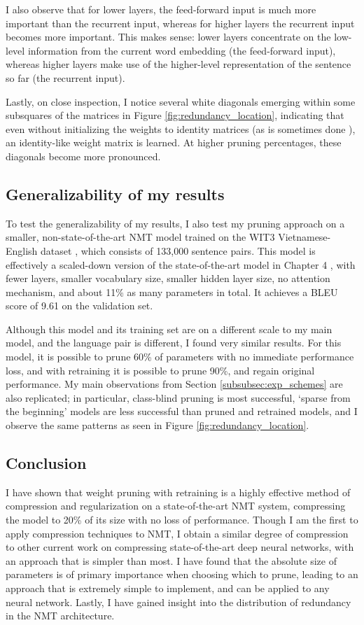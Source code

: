 I also observe that for lower layers, the feed-forward input is much more important than the recurrent input, whereas for higher layers the recurrent input becomes more important.
This makes sense: lower layers concentrate on the low-level information from the current word embedding (the feed-forward input), whereas higher layers make use of the higher-level representation of the sentence so far (the recurrent input).

Lastly, on close inspection, I notice several white diagonals emerging within
some subsquares of the matrices in Figure \ref{fig:redundancy_location},
indicating that even without initializing the weights to identity matrices
(as is sometimes done \cite{le2015simple}),
an identity-like weight matrix is learned. At higher pruning percentages, these diagonals become more pronounced.

\subsection{Generalizability of my results}
To test the generalizability of my results, I also test my pruning approach
on a smaller, non-state-of-the-art NMT model trained on the WIT3 Vietnamese-English 
dataset \cite{iwslt15}, which consists of 133,000 sentence pairs.
This model is effectively a scaled-down version of the state-of-the-art model in Chapter 4 \cite{luong15attn},
with fewer layers, smaller vocabulary size, smaller hidden layer size, no attention mechanism,
and about 11\% as many parameters in total.
It achieves a BLEU score of 9.61 on the validation set.

Although this model and its training set are on a different scale to my main model, 
and the language pair is different, 
I found very similar results. 
For this model, it is possible to prune 60\% of parameters with no immediate performance loss,
and with retraining it is possible to prune 90\%, and regain original performance.
My main observations from Section \ref{subsubsec:exp_schemes} %
are also replicated; in particular, class-blind pruning is most successful,
`sparse from the beginning' models are less successful than pruned and retrained models,
and I observe the same patterns as seen in Figure \ref{fig:redundancy_location}.

\subsection{Conclusion}
\label{subsec:conclusion}
I have shown that weight pruning with retraining is a highly effective method of compression and regularization on a state-of-the-art NMT system, compressing the model to 20\% of its size with no loss of performance. 
Though I am the first to apply compression techniques to NMT, I obtain a similar degree of compression to other current work on compressing state-of-the-art deep neural networks, with an approach that is simpler than most.
I have found that the absolute size of parameters is of primary importance when choosing which to prune, leading to an approach that is extremely simple to implement, and can be applied to any neural network.
Lastly, I have gained insight into the distribution of redundancy in the NMT architecture.

